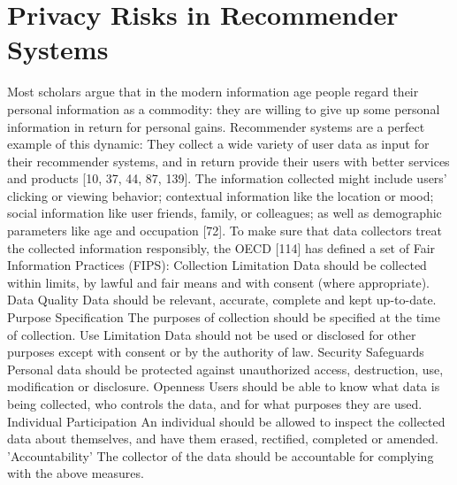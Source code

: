 \section{Privacy Risks in Recommender Systems}
Most scholars argue that in the modern information age people regard their personal information as a commodity: they are willing to give up some personal information in return for personal gains. Recommender systems are a perfect example of this dynamic: They collect a wide variety of user data as input for their recommender systems, and in return provide their users with better services and products [10, 37, 44, 87, 139]. The information collected might include users' clicking or viewing behavior; contextual information like the location or mood; social information like user friends, family, or colleagues; as well as demographic parameters like age and occupation [72]. To make sure that data collectors treat the collected information responsibly, the OECD [114] has defined a set of Fair Information Practices (FIPS): Collection Limitation Data should be collected within limits, by lawful and fair means and with consent (where appropriate). Data Quality Data should be relevant, accurate, complete and kept up-to-date. Purpose Specification The purposes of collection should be specified at the time of collection. Use Limitation Data should not be used or disclosed for other purposes except with consent or by the authority of law. Security Safeguards Personal data should be protected against unauthorized access, destruction, use, modification or disclosure. Openness Users should be able to know what data is being collected, who controls the data, and for what purposes they are used. Individual Participation An individual should be allowed to inspect the collected data about themselves, and have them erased, rectified, completed or amended. 'Accountability' The collector of the data should be accountable for complying with the above measures.
